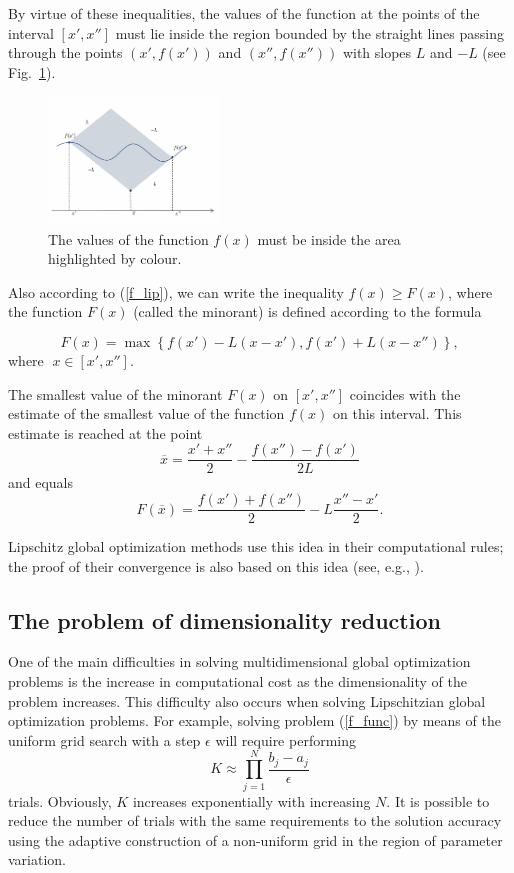 \documentclass[iicol]{sn-jnl}
\theoremstyle{thmstyleone}%
\theoremstyle{thmstyletwo}%
\theoremstyle{thmstylethree}%
\begin{document}
  By virtue of these inequalities, the values of the function at the points of the interval $[x', x'']$ must lie inside the region bounded by the straight lines passing through the points $(x', f(x'))$ and $(x'', f(x''))$ with slopes $L$ and $-L$ (see Fig.~\ref{fig1}).

\begin{figure}
\centering
\includegraphics[width=0.4\textwidth]{Fig1.pdf}
\caption{The values of the function $f(x)$ must be inside the area highlighted by colour.} \label{fig1}
\end{figure}

Also according to (\ref{f_lip}), we can write the inequality $f(x) \geq F(x)$, where the function  $F(x)$ (called the minorant) is defined according to the formula

\[
F(x) = \max\left\{f(x') - L(x-x'),f(x') + L(x-x'')\right\},
\] 
where $\; x\in [x', x'']$.

The smallest value of the minorant $F(x)$ on $[x', x'']$ coincides with the estimate of the smallest value of the function $f(x)$ on this interval. This estimate is reached at the point
\[
\overline{x} = \frac{x'+x''}{2}-\frac{f(x'')-f(x')}{2L}
\] 
and equals
\[
F(\overline{x}) = \frac{f(x')+f(x'')}{2} -L \frac{x''-x'}{2}.
\]

Lipschitz global optimization methods use this idea in their computational rules; the proof of their convergence is also based on this idea (see, e.g.,
\citet{Jones2021,PaulaviciusZilinskas2014,Sergeyev2013,Evtushenko2013}).

\subsection{The problem of dimensionality reduction} 

One of the main difficulties in solving multidimensional global optimization problems is the increase in computational cost as the dimensionality of the problem increases. This difficulty also occurs when solving Lipschitzian global optimization problems. 
For example, solving problem (\ref{f_func}) by means of the uniform grid search with a step $\epsilon$ will require performing
\[
K \approx \prod_{j=1}^N{\frac{b_j-a_j}{\epsilon}}
\]
trials. Obviously, $K$ increases exponentially with increasing $N$. It is possible to reduce the number of trials with the same requirements to the solution accuracy using the adaptive construction of a non-uniform grid in the region of parameter variation. 
\end{document}
